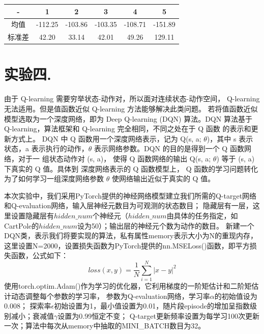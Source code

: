 \documentclass[a4paper,UTF8]{article}
\theoremstyle{definition}
\begin{document}

	\begin{tabular}{|c|c|c|c|c|c|}
	
		\hline
		
		\hline
		
		- & 1 & 2 & 3 & 4 & 5 \\
		
		\hline
		
		均值 & -112.25 & -103.86 & -103.35 & -108.71 & -151.89\\

		\hline

		标准差 & 42.20 & 33.14 & 42.01 & 49.26 & 129.11\\
		
		\hline
	
	\end{tabular}

\section*{实验四. }
由于 Q-learning 需要穷举状态-动作对，所以面对连续状态-动作空间， Q-learning 无法适用。但是值函数近似 Q-learning 方法能够解决此类问题。
若将值函数近似模型选取为一个深度网络，即为 Deep Q-learning (DQN) 算法。DQN 算法基于 Q-learning，算法框架和 Q-learning 完全相同，不同之处在于 Q 函数 的表示和更新方式上。
DQN 中 Q 函数用一个深度网络表示，记为 Q(s, a; $\theta$)，其中 s 表示 状态，a 表示执行的动作，$\theta$ 表示网络参数。DQN 的目的是得到一个 Q 函数网络，对于一 组状态动作对 (s, a)，
使得 Q 函数网络的输出 Q(s, a; $\theta$) 等于 (s, a) 下真实的 Q 值。具体到 深度网络表示的 Q 函数模型上，
Q 函数的学习问题转化为了如何学习一组深度网络参数 $\theta$ 使网络输出近似于真实的 Q 值。
	
本次实验中，我们采用PyTorch提供的神经网络模型建立我们所需的Q-target网络和Q-evaluation网络，输入层神经元数目为可观测的状态数目；
隐藏层有一层，这里设置隐藏层有$hidden\_num$个神经元（$hidden\_num$由具体的任务指定，如CartPole的$hidden\_num$设为50）；输出层的神经元个数为动作的数目。
新建一个DQN类，表示我们将要实现的算法，私有属性memory表示大小为N的重现内存，
这里设置N=2000，设置损失函数为PyTorch提供的nn.MSELoss()函数，即平方损失函数，公式如下：
$$loss(x, y) = \frac{1}{N} \sum_{i=1}^N |x - y|^2$$
使用torch.optim.Adam()作为学习的优化器，它利用梯度的一阶矩估计和二阶矩估计动态调整每个参数的学习率，
参数为Q-evaluation网络，学习率$\alpha$的初始值设为0.008；
探索率$\epsilon$初始设置为1，最小值设置为0.01，随片段episode的增加呈指数级别减小；衰减值$\gamma$设置为0.99恒定不变；
Q-target更新频率设置为每学习100次更新一次；算法中每次从memory中抽取的MINI\_BATCH数目为32。
\end{document}
